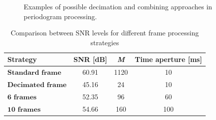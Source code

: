 \begin{figure}[t!]
		        \hfill
		        
		        \caption{\small Examples of possible decimation and combining approaches in periodogram processing.}
		        \label{fig:allperiodogram-decimation}
		    \end{figure}
		
		    
		
		
		    
		\begin{table}[H]
		    \centering 
		    \caption{Comparison between SNR levels for different frame processing strategies}
		    \label{table:TDDstratcomparison}
		    \begin{tabular}{|p{9em} c c c |}
		    \hline
		    \rowcolor{bluepoli!40} %
		    \textbf{Strategy} & \textbf{SNR [dB]} & \textbf{\textit{M}} & \textbf{Time aperture [ms]} \T\B \\
		    \hline \hline
		    $\textbf{Standard frame}$ & 60.91 & 1120 & 10 \T\B \\
		    $\textbf{Decimated frame}$ & 45.16 & 24 & 10 \T\B\\
		    $\textbf{6 frames}$ & 52.35 & 96 & 60  \T\B\\
		    $\textbf{10 frames}$ & 54.66 & 160 & 100  \T\B\\
		
		    \hline
		    \end{tabular}
		    \\
		\end{table}
		
